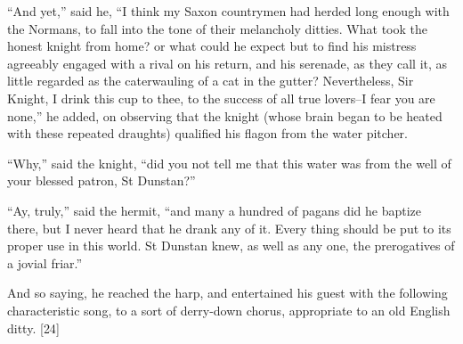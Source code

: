 ``And yet,'' said he, ``I think my Saxon countrymen had herded long
enough with the Normans, to fall into the tone of their melancholy
ditties. What took the honest knight from home? or what could he expect
but to find his mistress agreeably engaged with a rival on his return,
and his serenade, as they call it, as little regarded as the
caterwauling of a cat in the gutter? Nevertheless, Sir Knight, I drink
this cup to thee, to the success of all true lovers--I fear you are
none,'' he added, on observing that the knight (whose brain began to be
heated with these repeated draughts) qualified his flagon from the water
pitcher.

``Why,'' said the knight, ``did you not tell me that this water was from
the well of your blessed patron, St Dunstan?''

``Ay, truly,'' said the hermit, ``and many a hundred of pagans did he
baptize there, but I never heard that he drank any of it. Every thing
should be put to its proper use in this world. St Dunstan knew, as well
as any one, the prerogatives of a jovial friar.''

And so saying, he reached the harp, and entertained his guest with the
following characteristic song, to a sort of derry-down chorus,
appropriate to an old English ditty. {[}24{]}

